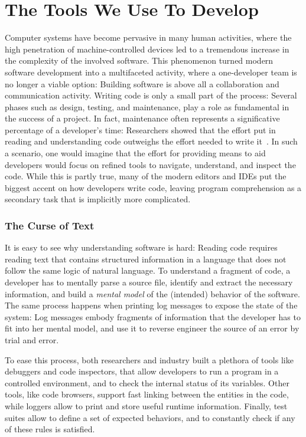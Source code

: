 \section{The Tools We Use To Develop} \label{sec:reified-introduction}

Computer systems have become pervasive in many human activities, where the high penetration of machine-controlled devices led to a tremendous increase in the complexity of the involved software.
This phenomenon turned modern software development into a multifaceted activity, where a one-developer team is no longer a viable option: Building software is above all a collaboration and communication activity.
Writing code is only a small part of the process: Several phases such as design, testing, and maintenance, play a role as fundamental in the success of a project.
In fact, maintenance often represents a significative percentage of a developer's time: Researchers showed that the effort put in reading and understanding code outweighs the effort needed to write it~\cite{Corb1989,Fjel1983,Zelk1979,Mine2015b}.
In such a scenario, one would imagine that the effort for providing means to aid developers would focus on refined tools to navigate, understand, and inspect the code.
While this is partly true, many of the modern editors and IDEs put the biggest accent on how developers write code, leaving program comprehension as a secondary task that is implicitly more complicated.


\subsubsection{The Curse of Text}

It is easy to see why understanding software is hard: Reading code requires reading text that contains structured information in a language that does not follow the same logic of natural language.
To understand a fragment of code, a developer has to mentally parse a source file, identify and extract the necessary information, and build a \emph{mental model} of the (intended) behavior of the software.
The same process happens when printing log messages to expose the state of the system: Log messages embody fragments of information that the developer has to fit into her mental model, and use it to reverse engineer the source of an error by trial and error.

To ease this process, both researchers and industry built a plethora of tools like debuggers and code inspectors, that allow developers to run a program in a controlled environment, and to check the internal status of its variables.
Other tools, like code browsers, support fast linking between the entities in the code, while loggers allow to print and store useful runtime information.
Finally, test suites allow to define a set of expected behaviors, and to constantly check if any of these rules is satisfied.

